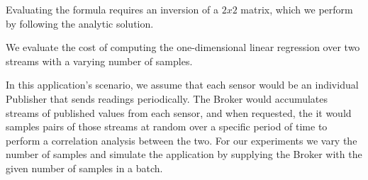 Evaluating the formula requires an inversion of a $2 x 2$ matrix, which we perform
by following the analytic solution.

We evaluate the cost of computing the one-dimensional linear regression over
two streams with a varying number of samples.

In this application's scenario, we assume that each sensor would be an
individual Publisher that sends readings periodically.  The Broker would
accumulates streams of published values from each sensor, and when requested,
the it would samples pairs of those streams at random over a specific period of
time to perform a correlation analysis between the two.  For our experiments we
vary the number of samples and simulate the application by supplying the Broker
with the given number of samples in a batch.

% 
% 
% 
% 


